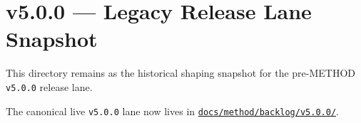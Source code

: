 \chapter{v5.0.0 --- Legacy Release Lane Snapshot}\label{record-393}

\smallskip

This directory remains as the historical shaping snapshot for the pre-METHOD \texttt{v\allowbreak{}5\allowbreak{}.\allowbreak{}0\allowbreak{}.\allowbreak{}0} release lane.

The canonical live \texttt{v\allowbreak{}5\allowbreak{}.\allowbreak{}0\allowbreak{}.\allowbreak{}0} lane now lives in \href{https://github.com/flyingrobots/bijou/blob/cbd70612140e7a450d764b3c7be1c6af878b99bc/docs/method/graveyard/method/backlog/v5.0.0/README.md}{\texttt{d\allowbreak{}o\allowbreak{}c\allowbreak{}s\allowbreak{}/\allowbreak{}m\allowbreak{}e\allowbreak{}t\allowbreak{}h\allowbreak{}o\allowbreak{}d\allowbreak{}/\allowbreak{}b\allowbreak{}a\allowbreak{}c\allowbreak{}k\allowbreak{}l\allowbreak{}o\allowbreak{}g\allowbreak{}/\allowbreak{}v\allowbreak{}5\allowbreak{}.\allowbreak{}0\allowbreak{}.\allowbreak{}0\allowbreak{}/}}.

